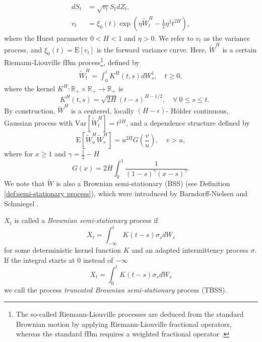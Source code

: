 \documentclass[11pt]{article}
\newcommand{\expt}[1]{\mathrm{E}\left[#1\right]}
\newcommand{\rset}{\mathbb{R}}
\newcommand{\COMMA}{,}
\begin{document}
\begin{align}\label{eq:rBergomi_model1}
	dS_t &= \sqrt{v_t} S_t dZ_t, \nonumber \\
	v_t &= \xi_0(t) \exp\left( \eta \widetilde{W}_t^H - \frac{1}{2} \eta^2 t^{2H} \right),
\end{align}
where the Hurst parameter $0 < H < 1$  and  $\eta>0$. We refer to $v_t$ as the variance process, and $\xi_0(t) = \expt{v_t}$ is  the forward variance curve.  Here, $\widetilde{W}^H $ is a certain Riemann-Liouville fBm
process\footnote{The so-called Riemann-Liouville processes are deduced from the standard Brownian motion by applying Riemann-Liouville fractional operators, whereas the standard fBm requires a weighted fractional operator \cite{sithi1995spectra,marinucci1999alternative,picard2011representation}.},  defined by
\begin{align}\label{eq:Volterra process}
	\widetilde{W}_t^H = \int_0^t K^H(t,s) dW_s^1, \quad t \ge 0 \COMMA
\end{align}
where the kernel $K^H : \rset_+ \times \rset_+ \rightarrow \rset_+$ is
\begin{equation}\label{eq:kernel_rbergomi}
 \quad K^H(t,s) = \sqrt{2H} (t-s)^{H - 1/2},\quad \forall \: 0 \le s \le t.
\end{equation}
By construction, $\widetilde{W}^H $ is a centered, locally $(H-\epsilon)$- H\"older continuous, Gaussian process with $\text{Var}\left[\widetilde{W}^H_t \right] = t^{2H}$, and a dependence structure defined by 
 \begin{equation*}
 \expt{\widetilde{W}^H_u  \widetilde{W}^H_v}=u^{2H} G\left(\frac{v}{u} \right),\quad v >u \COMMA
 \end{equation*}
 where for $x \ge 1$ and $\gamma=\frac{1}{2}-H$
\begin{equation}\label{eq:correlation_tilde_W_fun}
G(x)=2H \int_{0}^1 \frac{1}{(1-s)^\gamma (x-s)^\gamma}. 
\end{equation}
We note that $\widetilde{W}$ is also a Brownian semi-stationary (BSS) (see Definition \ref{def:semi-stationary process}), which were introduced by Barndorff-Nielsen and Schmiegel \cite{barndorff2007ambit,barndorff2009brownian}.

\begin{definition}\label{def:semi-stationary process}
$X_t$ is called a \textit{Brownian semi-stationary} process if
\begin{equation}\label{eq:BSS}
X_t=\int_{-\infty}^t K(t-s) \sigma_s dW_s
\end{equation}
for some deterministic kernel function $K$ and an adapted intermittency process $\sigma$. If the integral starts at $0$ instead of $−\infty$
\begin{equation}\label{eq:TBSS}
X_t=\int_{0}^t K(t-s) \sigma_s dW_s
\end{equation}
we call the process \textit{truncated Brownian semi-stationary} process (TBSS).
\end{definition} 
 
\end{document}
